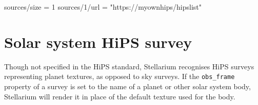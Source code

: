 \begin{configfile}
[hips]
sources/size = 1
sources/1/url = "https://myownhips/hipslist"

\end{configfile}

\section{Solar system HiPS survey}

Though not specified in the HiPS standard, Stellarium recognises HiPS surveys
representing planet textures, as opposed to sky surveys.  If the
\texttt{obs\_frame} property of a survey is set to the name of a planet or
other solar system body, Stellarium will render it in place of the default
texture used for the body.

